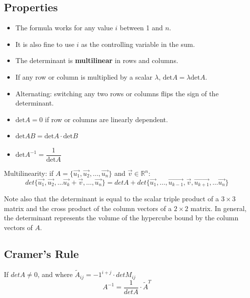 \documentclass[11pt]{article}
\begin{document}
	\subsection{Properties}
		\begin{itemize}
			\item The formula works for any value $i$ between 1 and $n$.
			\item It is also fine to use $i$ as the controlling variable in the sum.
			\item The determinant is \textbf{multilinear} in rows and columns.
			\item If any row or column is multiplied by a scalar $\lambda$, $\text{det} A = \lambda\text{det} A$.
			\item Alternating: switching any two rows or columns flips the sign of the determinant.
			\item $\text{det} A = 0$ if row or columns are linearly dependent.
			\item $\text{det} AB = \text{det} A\cdot\text{det} B$
			\item $\text{det} A^{-1} = \dfrac{1}{\text{det} A}$
		\end{itemize}
		Multilinearity: if $A=\{\vec{u_1}, \vec{u_2},\ldots,\vec{u_n}\}$ and $\vec{v}\in\mathbb{R}^n$:
		\begin{equation}
			det\{\vec{u_1}, \vec{u_2},\ldots\vec{u_k}+\vec{v},\ldots,\vec{u_n}\} = det A + det\{\vec{u_1},\ldots,\vec{u_{k-1}},\vec{v},\vec{u_{k+1}},\ldots\vec{u_n}\}
		\end{equation}
		
		Note also that the determinant is equal to the scalar triple product of a $3\times 3$ matrix and the cross product of the column vectors of a $2\times 2$ matrix. In general, the determinant represents the volume of the hypercube bound by the column vectors of $A$.
		
	\subsection{Cramer's Rule}
		If $det A\neq 0$, and where $\tilde{A}_{ij} = -1^{i+j}\cdot detM_{ij}$
		\begin{equation}
			A^{-1} = \frac{1}{det A}\cdot \tilde{A}^T
		\end{equation}
%		
%		


\end{document}
